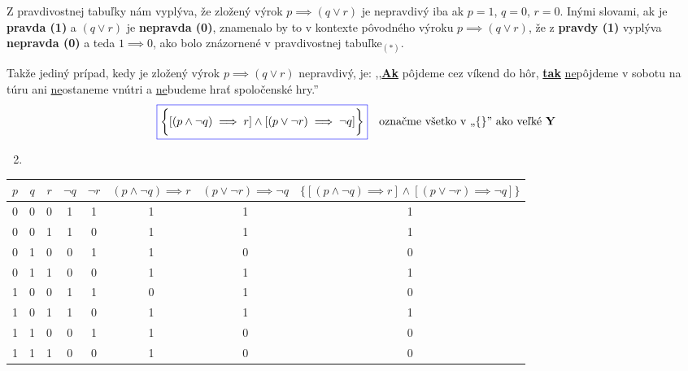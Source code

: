 \documentclass{article}
\begin{document}
\vspace{5mm}
Z pravdivostnej tabuľky nám vyplýva, že zložený výrok $p \implies (q \lor r)$ je nepravdivý iba ak $p = 1$, $q = 0$, $r = 0$.
Inými slovami, ak  je \textbf{pravda (1)} a $(q \lor r)$ je \textbf{nepravda (0)}, znamenalo by to v kontexte pôvodného výroku $p \implies (q \lor r)$, že z \textbf{pravdy (1)} vyplýva \textbf{nepravda (0)} a teda $1 \implies 0$, ako bolo znázornené v pravdivostnej tabuľke$_{(\ast)}$.\bigskip


Takže jediný prípad, kedy je zložený výrok $p \implies (q \lor r)$ nepravdivý, je: ,,\underline{\textbf{Ak}} pôjdeme cez víkend do hôr, \underline{\textbf{tak}} \underline{ne}pôjdeme v sobotu na túru ani \underline{ne}ostaneme vnútri a \underline{ne}budeme hrať spoločenské hry.'' 
\newpage
\begin{align*}
\fcolorbox{blue}{white}{$\displaystyle \bigg\{[(p \land \neg q) \implies r] \land [(p \lor \neg r) \implies \neg q]\bigg\}$} \quad \text{označme všetko v ,,\{\}'' ako veľké \textbf{Y}}
\end{align*}
\vspace{5mm}
\begin{enumerate}[label=\alph*)]
    \setcounter{enumi}{1} %
    \item {}
\end{enumerate}
\vspace{5mm}
\begin{center}
\large %
\renewcommand{\arraystretch}{1.1} %
\setlength{\tabcolsep}{5pt} %
\begin{tabular}{|c|c|c|c|c|c|c|c|}
\hline
$p$ & $q$ & $r$ & $\neg q$ & $\neg r$ & $(p \land \neg q) \implies r$ & $(p \lor \neg r) \implies \neg q$ & $\{[(p \land \neg q) \implies r] \land [(p \lor \neg r) \implies \neg q]\}$ \\ \hline
0 & 0 & 0 & 1 & 1 & 1 & 1 & 1 \\ \hline
0 & 0 & 1 & 1 & 0 & 1 & 1 & 1 \\ \hline
0 & 1 & 0 & 0 & 1 & 1 & 0 & 0 \\ \hline
0 & 1 & 1 & 0 & 0 & 1 & 1 & 1 \\ \hline
1 & 0 & 0 & 1 & 1 & 0 & 1 & 0 \\ \hline
1 & 0 & 1 & 1 & 0 & 1 & 1 & 1 \\ \hline
1 & 1 & 0 & 0 & 1 & 1 & 0 & 0 \\ \hline
1 & 1 & 1 & 0 & 0 & 1 & 0 & 0 \\ \hline
\end{tabular}
\end{center}
\end{document}
